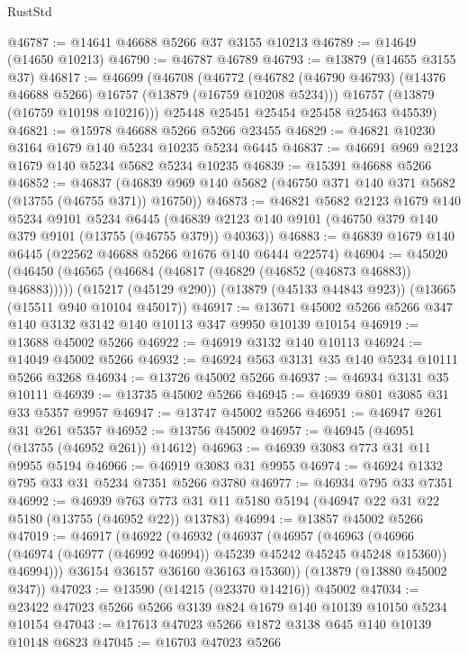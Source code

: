 \begin{lexlean}{RustStd}
\begin{coremodule}
@46787 := @14641 @46688 @5266 @37 @3155 @10213
@46789 := @14649 (@14650 @10213)
@46790 := @46787 @46789
@46793 := @13879 (@14655 @3155 @37)
@46817 := @46699
    (@46708
      (@46772
        (@46782 (@46790 @46793) (@14376 @46688 @5266) @16757 (@13879 (@16759 @10208 @5234)))
        @16757
        (@13879 (@16759 @10198 @10216)))
      @25448
      @25451
      @25454
      @25458
      @25463
      @45539)
@46821 := @15978 @46688 @5266 @5266 @23455
@46829 := @46821 @10230 @3164 @1679 @140 @5234 @10235 @5234 @6445
@46837 := @46691 @969 @2123 @1679 @140 @5234 @5682 @5234 @10235
@46839 := @15391 @46688 @5266
@46852 := @46837
    (@46839 @969 @140 @5682 (@46750 @371 @140 @371 @5682 (@13755 (@46755 @371)) @16750))
@46873 := @46821
    @5682
    @2123
    @1679
    @140
    @5234
    @9101
    @5234
    @6445
    (@46839 @2123 @140 @9101 (@46750 @379 @140 @379 @9101 (@13755 (@46755 @379)) @40363))
@46883 := @46839 @1679 @140 @6445 (@22562 @46688 @5266 @1676 @140 @6444 @22574)
@46904 := @45020
    (@46450 (@46565 (@46684 (@46817 (@46829 (@46852 (@46873 @46883)) @46883)))))
    (@15217 (@45129 @290))
    (@13879 (@45133 @44843 @923))
    (@13665 (@15511 @940 @10104 @45017))
@46917 := @13671 @45002 @5266 @5266 @347 @140 @3132 @3142 @140 @10113 @347 @9950 @10139 @10154
@46919 := @13688 @45002 @5266
@46922 := @46919 @3132 @140 @10113
@46924 := @14049 @45002 @5266
@46932 := @46924 @563 @3131 @35 @140 @5234 @10111 @5266 @3268
@46934 := @13726 @45002 @5266
@46937 := @46934 @3131 @35 @10111
@46939 := @13735 @45002 @5266
@46945 := @46939 @801 @3085 @31 @33 @5357 @9957
@46947 := @13747 @45002 @5266
@46951 := @46947 @261 @31 @261 @5357
@46952 := @13756 @45002
@46957 := @46945 (@46951 (@13755 (@46952 @261)) @14612)
@46963 := @46939 @3083 @773 @31 @11 @9955 @5194
@46966 := @46919 @3083 @31 @9955
@46974 := @46924 @1332 @795 @33 @31 @5234 @7351 @5266 @3780
@46977 := @46934 @795 @33 @7351
@46992 := @46939
    @763
    @773
    @31
    @11
    @5180
    @5194
    (@46947 @22 @31 @22 @5180 (@13755 (@46952 @22)) @13783)
@46994 := @13857 @45002 @5266
@47019 := @46917
    (@46922
      (@46932
        (@46937
          (@46957
            (@46963
              (@46966 (@46974 (@46977 (@46992 @46994)) @45239 @45242 @45245 @45248 @15360))
              @46994)))
        @36154
        @36157
        @36160
        @36163
        @15360))
    (@13879 (@13880 @45002 @347))
@47023 := @13590 (@14215 (@23370 @14216)) @45002
@47034 := @23422 @47023 @5266 @5266 @3139 @824 @1679 @140 @10139 @10150 @5234 @10154
@47043 := @17613 @47023 @5266 @1872 @3138 @645 @140 @10139 @10148 @6823
@47045 := @16703 @47023 @5266

\end{coremodule}
\end{lexlean}
